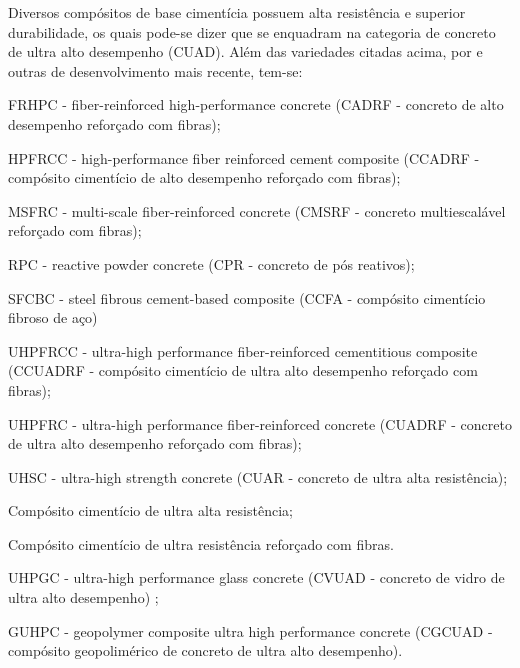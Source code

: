 
Diversos compósitos de base cimentícia possuem alta resistência e superior durabilidade, os quais pode-se dizer que se enquadram na categoria de concreto de ultra alto desempenho (CUAD). Além das variedades citadas acima, por  e outras de desenvolvimento mais recente, tem-se:

\begin{alineas}[label=\textbullet]
  \item FRHPC - fiber-reinforced high-performance concrete (CADRF - concreto de alto desempenho reforçado com fibras);
  \item HPFRCC - high-performance fiber reinforced cement composite (CCADRF - compósito cimentício de alto desempenho reforçado com fibras);
  \item MSFRC - multi-scale fiber-reinforced concrete (CMSRF - concreto multiescalável reforçado com fibras);
  \item RPC - reactive powder concrete (CPR - concreto de pós reativos);
  \item SFCBC - steel fibrous cement-based composite (CCFA - compósito cimentício fibroso de aço)
  \item UHPFRCC - ultra-high performance fiber-reinforced cementitious composite (CCUADRF - compósito cimentício de ultra alto desempenho reforçado com fibras);
  \item UHPFRC - ultra-high performance fiber-reinforced concrete (CUADRF - concreto de ultra alto desempenho reforçado com fibras);
  \item UHSC - ultra-high strength concrete (CUAR - concreto de ultra alta resistência);
  \item Compósito cimentício de ultra alta resistência;
  \item Compósito cimentício de ultra resistência reforçado com fibras.
  \item UHPGC - ultra-high performance glass concrete (CVUAD - concreto de vidro de ultra alto desempenho) \cite{Soliman};
  \item GUHPC - geopolymer composite ultra high performance concrete (CGCUAD - compósito geopolimérico de concreto de ultra alto desempenho)\cite{Gong}.
\end{alineas}

